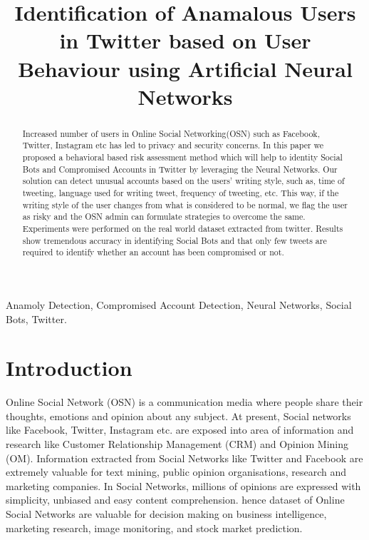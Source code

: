\documentclass[conference]{IEEEtran}
\begin{document}
\title{Identification of Anamalous Users in Twitter based on User Behaviour using Artificial Neural Networks}

\author{

}

\maketitle

\begin{abstract}

Increased number of users in Online Social Networking(OSN) such as Facebook, Twitter, Instagram etc has led to privacy and security concerns. In this paper we proposed a behavioral based risk assessment method which will help to identity Social Bots and Compromised Accounts in Twitter by leveraging the Neural Networks.
Our solution can detect unusual accounts based on the users' writing style, such as, time of tweeting, language used for writing tweet, frequency of tweeting, etc. This way, if the writing style of the user changes 
from what is considered to be normal, we flag the user as risky and the OSN admin can formulate strategies to overcome the same. Experiments were performed 
on the real world dataset extracted from twitter. Results show tremendous accuracy in identifying Social Bots and that only few tweets are required to identify whether an account has been compromised or not.

\end{abstract}

\begin{IEEEkeywords}

Anamoly Detection, Compromised Account Detection, Neural Networks, Social Bots, Twitter.

\end{IEEEkeywords}

\section{Introduction}

Online Social Network (OSN) is a communication media where people share their thoughts, emotions and opinion about any subject. At present, Social networks like Facebook, Twitter, Instagram etc. are exposed
into area of information and research like Customer Relationship Management (CRM) and Opinion Mining (OM). Information extracted from Social Networks like Twitter and Facebook are extremely valuable for text mining, public opinion organisations, research and marketing companies.
In Social Networks, millions of opinions are expressed with simplicity, unbiased and easy content comprehension. hence dataset of Online Social Networks are valuable for decision making on 
business intelligence, marketing research,  image monitoring, and stock market prediction.
\end{document}
